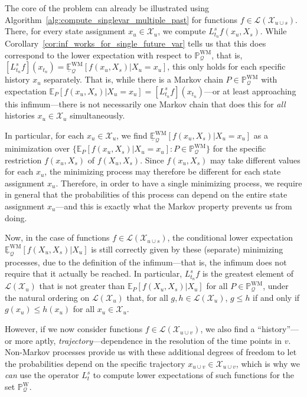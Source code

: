 \documentclass[10pt,a4paper]{paper}
\theoremstyle{definition}
\newcommand{\states}{\mathcal{X}}
\newcommand{\processes}{\mathbb{P}}
\newcommand{\wprocesses}{\processes^{\mathrm{W}}}
\newcommand{\wmprocesses}{\processes^{\mathrm{WM}}}
\newcommand{\gambles}{\mathcal{L}}
\newcommand{\rateset}{\mathcal{Q}}
\begin{document}
The core of the problem can already be illustrated using Algorithm~\ref{alg:compute_singlevar_multiple_past} for functions $f\in\gambles(\states_{u\cup s})$. There, for every state assignment $x_u\in\states_u$, we compute $L_{t_n}^sf(x_u,X_s)$. While Corollary~\ref{cor:inf_works_for_single_future_var} tells us that this does correspond to the lower expectation with respect to $\wmprocesses_{\rateset}$, that is, $[L_{t_n}^sf](x_{t_n})=\underline{\mathbb{E}}_\rateset^\mathrm{WM}[f(x_u,X_s)\vert X_u=x_u]$, this only holds for each specific history $x_u$ separately. That is, while there is a Markov chain $P\in\wmprocesses_\rateset$ with expectation $\mathbb{E}_P[f(x_u,X_s)\vert X_u=x_u]=[L_{t_n}^sf](x_{t_n})$---or at least approaching this infimum---there is not necessarily one Markov chain that does this for \emph{all} histories $x_u\in\states_u$ simultaneously.

In particular, for each $x_u\in\states_u$, we find $\underline{\mathbb{E}}_\rateset^\mathrm{WM}[f(x_u,X_s)\vert X_u=x_u]$ as a minimization over $\{\mathbb{E}_P[f(x_u,X_s)\vert X_u=x_u] : P\in\wmprocesses_\rateset\}$ for the specific restriction $f(x_u,X_s)$ of $f(X_u,X_s)$. Since $f(x_u,X_s)$ may take different values for each $x_u$, the minimizing process may therefore be different for each state assignment $x_u$. Therefore, in order to have a single minimizing process, we require in general that the probabilities of this process can depend on the entire state assignment $x_u$---and this is exactly what the Markov property prevents us from doing.

Now, in the case of functions $f\in\gambles(\states_{u\cup s})$, the conditional lower expectation $\underline{\mathbb{E}}_\rateset^\mathrm{WM}[f(X_u,X_s)\vert X_u]$ is still correctly given by these (separate) minimizing processes, due to the definition of the infimum---that is, the infimum does not require that it actually be reached. In particular, $L_{t_n}^sf$ is the greatest element of $\gambles(\states_u)$ that is not greater than $\mathbb{E}_P[f(X_u,X_s)\vert X_u]$ for all $P\in\wmprocesses_\rateset$, under the natural ordering on $\gambles(\states_u)$ that, for all $g,h\in\gambles(\states_u)$, $g\leq h$ if and only if $g(x_u)\leq h(x_u)$ for all $x_u\in\states_u$.

However, if we now consider functions $f\in\gambles(\states_{u\cup v})$, we also find a ``history''---or more aptly, \emph{trajectory}---dependence in the resolution of the time points in $v$. Non-Markov processes provide us with these additional degrees of freedom to let the probabilities depend on the specific trajectory $x_{u\cup v}\in\states_{u\cup v}$, which is why we \emph{can} use the operator $L_t^s$ to compute lower expectations of such functions for the set $\wprocesses_{\rateset}$.
\end{document}
